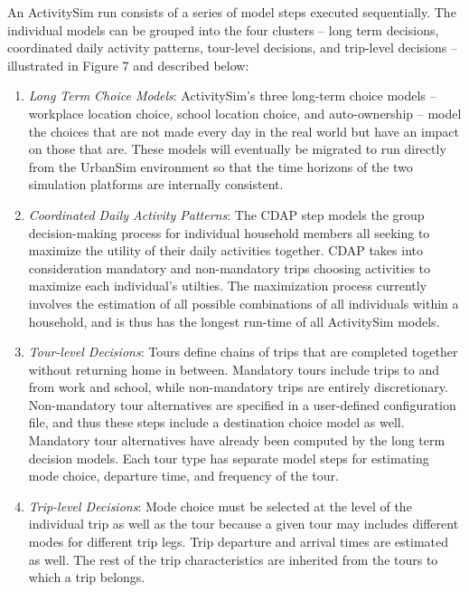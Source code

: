 An ActivitySim run consists of a series of model steps executed sequentially. The individual models can be grouped into the four clusters -- long term decisions, coordinated daily activity patterns, tour-level decisions, and trip-level decisions -- illustrated in Figure 7 and described below:
\begin{enumerate}[label=(\roman*)]
    \item \textit{Long Term Choice Models}: ActivitySim's three long-term choice models -- workplace location choice, school location choice, and auto-ownership -- model the choices that are not made every day in the real world but have an impact on those that are. These models will eventually be migrated to run directly from the UrbanSim environment so that the time horizons of the two simulation platforms are internally consistent.
    \item \textit{Coordinated Daily Activity Patterns}: The CDAP step models the group decision-making process for individual household members all seeking to maximize the utility of their daily activities together. CDAP takes into consideration mandatory and non-mandatory trips choosing activities to maximize each individual's utilties. The maximization process currently involves the estimation of all possible combinations of all individuals within a household, and is thus has the longest run-time of all ActivitySim models. 
    \item \textit{Tour-level Decisions}: Tours define chains of trips that are completed together without returning home in between. Mandatory tours include trips to and from work and school, while non-mandatory trips are entirely discretionary. Non-mandatory tour alternatives are specified in a user-defined configuration file, and thus these steps include a destination choice model as well. Mandatory tour alternatives have already been computed by the long term decision models. Each tour type has separate model steps for estimating mode choice, departure time, and frequency of the tour.
    \item \textit{Trip-level Decisions}: Mode choice must be selected at the level of the individual trip as well as the tour because a given tour may includes different modes for different trip legs. Trip departure and arrival times are estimated as well. The rest of the trip characteristics are inherited from the tours to which a trip belongs. 
\end{enumerate}

